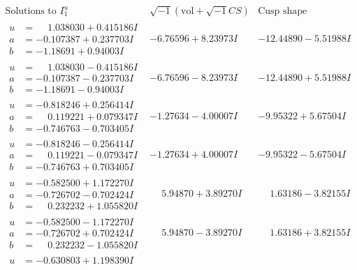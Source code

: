 \documentclass[1p]{elsarticle_modified}
\theoremstyle{definition}
\newcommand{\I}{\sqrt{-1}}
\begin{document}
$$\begin{array}{c|c|c}  
\text{Solutions to }I^u_{1}& \I (\text{vol} + \sqrt{-1}CS) & \text{Cusp shape}\\
 \hline 
\begin{aligned}
u &= \phantom{-}1.038030 + 0.415186 I \\
a &= -0.107387 + 0.237703 I \\
b &= -1.18691 + 0.94003 I\end{aligned}
 & -6.76596 + 8.23973 I & -12.44890 - 5.51988 I \\ \hline\begin{aligned}
u &= \phantom{-}1.038030 - 0.415186 I \\
a &= -0.107387 - 0.237703 I \\
b &= -1.18691 - 0.94003 I\end{aligned}
 & -6.76596 - 8.23973 I & -12.44890 + 5.51988 I \\ \hline\begin{aligned}
u &= -0.818246 + 0.256414 I \\
a &= \phantom{-}0.119221 + 0.079347 I \\
b &= -0.746763 - 0.703405 I\end{aligned}
 & -1.27634 - 4.00007 I & -9.95322 + 5.67504 I \\ \hline\begin{aligned}
u &= -0.818246 - 0.256414 I \\
a &= \phantom{-}0.119221 - 0.079347 I \\
b &= -0.746763 + 0.703405 I\end{aligned}
 & -1.27634 + 4.00007 I & -9.95322 - 5.67504 I \\ \hline\begin{aligned}
u &= -0.582500 + 1.172270 I \\
a &= -0.726702 - 0.702424 I \\
b &= \phantom{-}0.232232 + 1.055820 I\end{aligned}
 & \phantom{-}5.94870 + 3.89270 I & \phantom{-}1.63186 - 3.82155 I \\ \hline\begin{aligned}
u &= -0.582500 - 1.172270 I \\
a &= -0.726702 + 0.702424 I \\
b &= \phantom{-}0.232232 - 1.055820 I\end{aligned}
 & \phantom{-}5.94870 - 3.89270 I & \phantom{-}1.63186 + 3.82155 I \\ \hline\begin{aligned}
u &= -0.630803 + 1.198390 I \\

\end{aligned}
\end{array}$$
\end{document}
